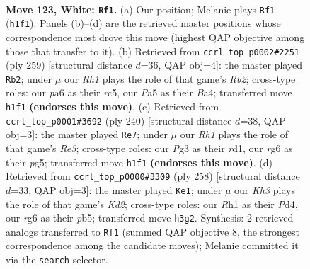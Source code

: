 \documentclass[11pt]{article}
\begin{document}
\begin{figure}[p]\centering
\begin{subfigure}{0.46\textwidth}\centering
\resizebox{\linewidth}{!}{%
\newchessgame
\chessboard[
  setfen={7k/8/p5r1/P1p2p1p/1p3P1P/1P2P1PK/8/7R w - - 33 123},
  showmover=false,
  pgfstyle=straightmove, color=movearrow, markmove={h1-f1}
]}
\caption{}
\end{subfigure}\hfill
\begin{subfigure}{0.46\textwidth}\centering
\resizebox{\linewidth}{!}{%
\newchessgame
\chessboard[
  setfen={8/1r3kp1/4p2p/2R1Pp1P/b4P2/8/4B1K1/8 b - - 2 130},
  showmover=false,
  pgfstyle=straightmove, color=movearrow, markmove={b7-b2}
]}
\caption{}
\end{subfigure}
\\[4pt]
\begin{subfigure}{0.46\textwidth}\centering
\resizebox{\linewidth}{!}{%
\newchessgame
\chessboard[
  setfen={5k2/8/n1Bp1P1p/p1p3p1/P1P3P1/1P2R2K/8/3r4 w - - 1 121},
  showmover=false,
  pgfstyle=straightmove, color=movearrow, markmove={e3-e7}
]}
\caption{}
\end{subfigure}\hfill
\begin{subfigure}{0.46\textwidth}\centering
\resizebox{\linewidth}{!}{%
\newchessgame
\chessboard[
  setfen={8/1b1k3N/8/1p3p2/p1pP1Pp1/P1P3P1/1P1K4/8 w - - 41 130},
  showmover=false,
  pgfstyle=straightmove, color=movearrow, markmove={d2-e1}
]}
\caption{}
\end{subfigure}
\caption{\textbf{Move 123, White: \texttt{Rf1}.} (a) Our position; Melanie plays \texttt{Rf1} (\texttt{h1f1}). Panels (b)--(d) are the retrieved master positions whose correspondence most drove this move (highest QAP objective among those that transfer to it). (b) Retrieved from \texttt{ccrl\_top\_p0002\#2251} (ply 259) [structural distance $d$=36, QAP obj=4]: the master played \texttt{Rb2}; under $\mu$ our \emph{Rh1} plays the role of that game's \emph{Rb2}; cross-type roles: our \emph{p}a6 as their \emph{r}c5, our \emph{P}a5 as their \emph{B}a4; transferred move \texttt{h1f1} \textbf{(endorses this move)}. (c) Retrieved from \texttt{ccrl\_top\_p0001\#3692} (ply 240) [structural distance $d$=38, QAP obj=3]: the master played \texttt{Re7}; under $\mu$ our \emph{Rh1} plays the role of that game's \emph{Re3}; cross-type roles: our \emph{P}g3 as their \emph{r}d1, our \emph{r}g6 as their \emph{p}g5; transferred move \texttt{h1f1} \textbf{(endorses this move)}. (d) Retrieved from \texttt{ccrl\_top\_p0000\#3309} (ply 258) [structural distance $d$=33, QAP obj=3]: the master played \texttt{Ke1}; under $\mu$ our \emph{Kh3} plays the role of that game's \emph{Kd2}; cross-type roles: our \emph{R}h1 as their \emph{P}d4, our \emph{r}g6 as their \emph{p}b5; transferred move \texttt{h3g2}. Synthesis: 2 retrieved analogs transferred to \texttt{Rf1} (summed QAP objective 8, the strongest correspondence among the candidate moves); Melanie committed it via the \texttt{search} selector.}
\label{fig:thought-m244}
\end{figure}
\end{document}
